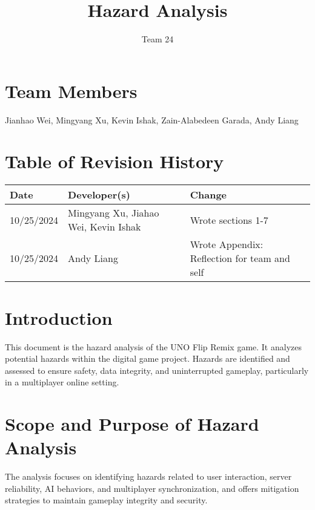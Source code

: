 \documentclass{article}
\title{Hazard Analysis}
\author{Team 24}
\date{}
\begin{document}
\maketitle

\section*{Team Members}
Jianhao Wei, Mingyang Xu, Kevin Ishak, Zain-Alabedeen Garada, Andy Liang

\section*{Table of Revision History}
\begin{longtable}{|l|l|l|}
    \hline
    Date & Developer(s) & Change \\
    \hline
    10/25/2024 & Mingyang Xu, Jiahao Wei, Kevin Ishak & Wrote sections 1-7 \\
    10/25/2024 & Andy Liang & Wrote Appendix: Reflection for team and self \\
    \hline
\end{longtable}

\tableofcontents

\newpage

\section{Introduction}
This document is the hazard analysis of the UNO Flip Remix game. It analyzes potential hazards within the digital game project. Hazards are identified and assessed to ensure safety, data integrity, and uninterrupted gameplay, particularly in a multiplayer online setting.

\section{Scope and Purpose of Hazard Analysis}
The analysis focuses on identifying hazards related to user interaction, server reliability, AI behaviors, and multiplayer synchronization, and offers mitigation strategies to maintain gameplay integrity and security.
\end{document}
